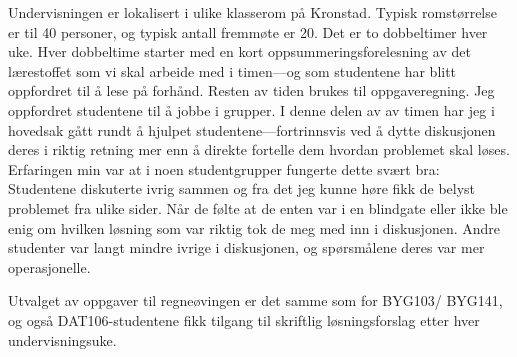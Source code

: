 \documentclass[a4paper,norsk,12pt]{report}
\begin{document}
Undervisningen er lokalisert i ulike klasserom på Kronstad. Typisk rom\-størrelse er til 40 personer, og typisk antall fremmøte er 20. Det er to dobbeltimer hver uke. Hver dobbeltime starter med en kort oppsummeringsforelesning av det lærestoffet som vi skal arbeide med i timen---og som studentene har blitt oppfordret til å lese på forhånd. Resten av tiden brukes til oppgaveregning. Jeg oppfordret studentene til å jobbe i grupper. I denne delen av av timen har jeg i hovedsak gått rundt å hjulpet studentene---fortrinnsvis ved å dytte diskusjonen deres i riktig retning mer enn å direkte fortelle dem hvordan problemet skal løses. Erfaringen min var at i noen studentgrupper fungerte dette svært bra: Studentene diskuterte ivrig sammen og fra det jeg kunne høre fikk de belyst problemet fra ulike sider. Når de følte at de enten var i en blindgate eller ikke ble enig om hvilken løsning som var riktig tok de meg med inn i diskusjonen. Andre studenter var langt mindre ivrige i diskusjonen, og spørsmålene deres var mer operasjonelle.

Utvalget av oppgaver til regneøvingen er det samme som for BYG103/ BYG141, og også DAT106-studentene fikk tilgang til skriftlig løsningsforslag etter hver undervisningsuke. 
\end{document}
